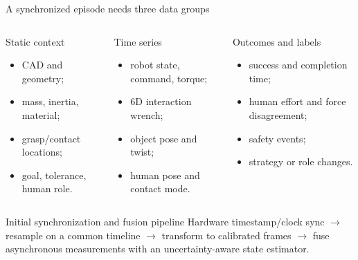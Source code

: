 \documentclass[aspectratio=169,11pt]{beamer}
\begin{document}
\begin{frame}{A synchronized episode needs three data groups}
\begin{columns}[T,onlytextwidth]
\begin{block}{Static context}
\begin{itemize}
  \item CAD and geometry;
  \item mass, inertia, material;
  \item grasp/contact locations;
  \item goal, tolerance, human role.
\end{itemize}
\end{block}
\begin{block}{Time series}
\begin{itemize}
  \item robot state, command, torque;
  \item 6D interaction wrench;
  \item object pose and twist;
  \item human pose and contact mode.
\end{itemize}
\end{block}
\begin{block}{Outcomes and labels}
\begin{itemize}
  \item success and completion time;
  \item human effort and force disagreement;
  \item safety events;
  \item strategy or role changes.
\end{itemize}
\end{block}
\end{columns}
\vspace{0.25cm}
\begin{alertblock}{Initial synchronization and fusion pipeline}
Hardware timestamp/clock sync $\rightarrow$ resample on a common timeline $\rightarrow$ transform to calibrated frames $\rightarrow$ fuse asynchronous measurements with an uncertainty-aware state estimator.
\end{alertblock}
\end{frame}
\end{document}
